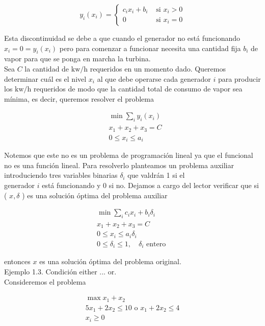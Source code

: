 \documentclass[10pt]{article}
\begin{document}
$$
y_{i}\left(x_{i}\right)= \begin{cases}c_{i} x_{i}+b_{i} & \text { si } x_{i}>0 \\ 0 & \text { si } x_{i}=0\end{cases}
$$

Esta discontinuidad se debe a que cuando el generador no está funcionando $x_{i}=0=y_{i}\left(x_{i}\right)$ pero para comenzar a funcionar necesita una cantidad fija $b_{i}$ de vapor para que se ponga en marcha la turbina.\\
Sea $C$ la cantidad de $\mathrm{kw} / \mathrm{h}$ requeridos en un momento dado. Queremos determinar cuál es el nivel $x_{i}$ al que debe operarse cada generador $i$ para producir los $\mathrm{kw} / \mathrm{h}$ requeridos de modo que la cantidad total de consumo de vapor sea mínima, es decir, queremos resolver el problema

$$
\begin{aligned}
& \min \sum_{i} y_{i}\left(x_{i}\right) \\
& x_{1}+x_{2}+x_{3}=C \\
& 0 \leq x_{i} \leq a_{i}
\end{aligned}
$$

Notemos que este no es un problema de programación lineal ya que el funcional no es una función lineal. Para resolverlo planteamos un problema auxiliar introduciendo tres variables binarias $\delta_{i}$ que valdrán 1 si el\\
generador $i$ está funcionando y 0 si no. Dejamos a cargo del lector verificar que si ( $x, \delta$ ) es una solución óptima del problema auxiliar

$$
\begin{gathered}
\min \sum_{i} c_{i} x_{i}+b_{i} \delta_{i} \\
x_{1}+x_{2}+x_{3}=C \\
0 \leq x_{i} \leq a_{i} \delta_{i} \\
0 \leq \delta_{i} \leq 1, \quad \delta_{i} \text { entero }
\end{gathered}
$$

entonces $x$ es una solución óptima del problema original.\\
Ejemplo 1.3. Condición either ... or.\\
Consideremos el problema


\begin{gather*}
\max x_{1}+x_{2} \\
5 x_{1}+2 x_{2} \leq 10 \text { o } x_{1}+2 x_{2} \leq 4  \tag{1}\\
x_{i} \geq 0
\end{gather*}
\end{document}
